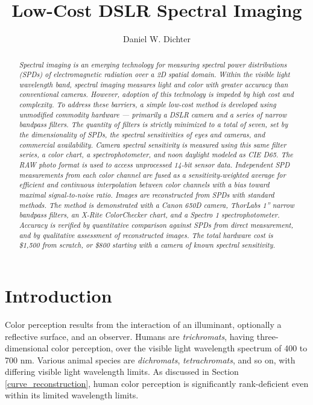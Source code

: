 \documentclass[twocolumn,10pt]{asme2ej}
\title{Low-Cost DSLR Spectral Imaging}
\author{Daniel W. Dichter
    \affiliation{
Independent Researcher\\
Cambridge, Massachusetts, U.S.A.\\
daniel.w.dichter@gmail.com
    }	
}
\begin{document}
\maketitle

\begin{abstract}{\it \noindent Spectral imaging is an emerging technology for measuring spectral power distributions (SPDs) of electromagnetic radiation over a 2D spatial domain. Within the visible light wavelength band, spectral imaging measures light and color with greater accuracy than conventional cameras. However, adoption of this technology is impeded by high cost and complexity. To address these barriers, a simple low-cost method is developed using unmodified commodity hardware --- primarily a DSLR camera and a series of narrow bandpass filters. The quantity of filters is strictly minimized to a total of seven, set by the dimensionality of SPDs, the spectral sensitivities of eyes and cameras, and commercial availability. Camera spectral sensitivity is measured using this same filter series, a color chart, a spectrophotometer, and noon daylight modeled as CIE D65. The RAW photo format is used to access unprocessed 14-bit sensor data. Independent SPD measurements from each color channel are fused as a sensitivity-weighted average for efficient and continuous interpolation between color channels with a bias toward maximal signal-to-noise ratio. Images are reconstructed from SPDs with standard methods. The method is demonstrated with a Canon 650D camera, ThorLabs 1'' narrow bandpass filters, an X-Rite ColorChecker chart, and a Spectro 1 spectrophotometer. Accuracy is verified by quantitative comparison against SPDs from direct measurement, and by qualitative assessment of reconstructed images. The total hardware cost is \$1,500 from scratch, or \$800 starting with a camera of known spectral sensitivity.
}
\end{abstract}

\section{Introduction}


\noindent Color perception results from the interaction of an illuminant, optionally a reflective surface, and an observer. Humans are \textit{trichromats}, having three-dimensional color perception, over the visible light wavelength spectrum of 400 to 700 nm. Various animal species are \textit{dichromats}, \textit{tetrachromats}, and so on, with differing visible light wavelength limits. As discussed in Section \ref{curve_reconstruction}, human color perception is significantly rank-deficient even within its limited wavelength limits.
\end{document}
